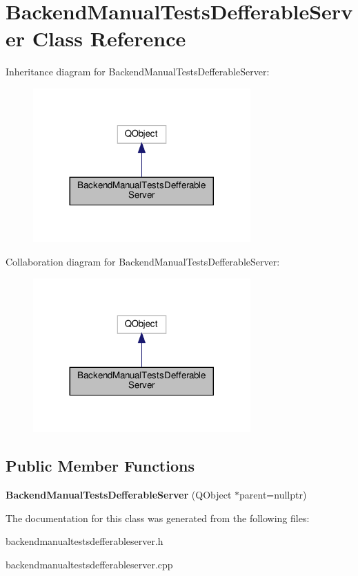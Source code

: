 \hypertarget{classBackendManualTestsDefferableServer}{}\section{Backend\+Manual\+Tests\+Defferable\+Server Class Reference}
\label{classBackendManualTestsDefferableServer}


Inheritance diagram for Backend\+Manual\+Tests\+Defferable\+Server\+:\nopagebreak
\begin{figure}[H]
\begin{center}
\leavevmode
\includegraphics[width=236pt]{classBackendManualTestsDefferableServer__inherit__graph}
\end{center}
\end{figure}


Collaboration diagram for Backend\+Manual\+Tests\+Defferable\+Server\+:\nopagebreak
\begin{figure}[H]
\begin{center}
\leavevmode
\includegraphics[width=236pt]{classBackendManualTestsDefferableServer__coll__graph}
\end{center}
\end{figure}
\subsection*{Public Member Functions}
\begin{DoxyCompactItemize}
\item 
\mbox{\label{classBackendManualTestsDefferableServer_a3c6facaeee8515a5f9146681eb66d30c}} 
{\bfseries Backend\+Manual\+Tests\+Defferable\+Server} (Q\+Object $\ast$parent=nullptr)
\end{DoxyCompactItemize}


The documentation for this class was generated from the following files\+:\begin{DoxyCompactItemize}
\item 
backendmanualtestsdefferableserver.\+h\item 
backendmanualtestsdefferableserver.\+cpp\end{DoxyCompactItemize}
